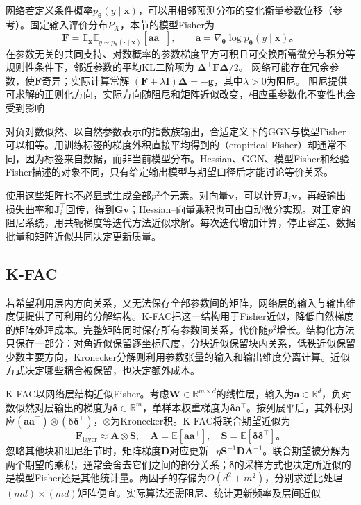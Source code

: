 网络若定义条件概率$p_{\bm\theta}(y\mid\bm x)$，可以用相邻预测分布的变化衡量参数位移（参考）。固定输入评价分布$P_X$，本节的模型Fisher为
\begin{equation}
  \bm F=\mathbb E_{\bm x}\mathbb E_{y\sim p_{\bm\theta}(\cdot\mid\bm x)}
    [\bm a\bm a^{\top}],\qquad
  \bm a=\nabla_{\bm\theta}\log p_{\bm\theta}(y\mid\bm x)\text{。}
  \label{eq:training-fisher}
\end{equation}
在参数无关的共同支持、对数概率的参数梯度平方可积且可交换所需微分与积分等规则性条件下，邻近参数的平均KL二阶项为
$\bm\Delta^\top\bm F\bm\Delta/2$。
网络可能存在冗余参数，使$\bm F$奇异；实际计算常解
$(\bm F+\lambda\bm I)\bm\Delta=-\bm g$，其中$\lambda>0$为阻尼。
阻尼提供可求解的正则化方向，实际方向随阻尼和矩阵近似改变，相应重参数化不变性也会受到影响

对负对数似然、以自然参数表示的指数族输出，合适定义下的GGN与模型Fisher可以相等。用训练标签的梯度外积直接平均得到的（empirical Fisher）却通常不同，因为标签来自数据，而非当前模型分布。Hessian、GGN、模型Fisher和经验Fisher描述的对象不同，只有给定输出模型与期望口径后才能讨论等价关系。

使用这些矩阵也不必显式生成全部$p^2$个元素。对向量$\bm v$，可以计算$\bm J_i\bm v$，再经输出损失曲率和$\bm J_i^{\top}$回传，得到$\bm G\bm v$；Hessian--向量乘积也可由自动微分实现。对正定的阻尼系统，用共轭梯度等迭代方法近似求解。每次迭代增加计算，停止容差、数据批量和矩阵近似共同决定更新质量。

\subsection{K-FAC}
\label{sec:training-structured-preconditioning}

若希望利用层内方向关系，又无法保存全部参数间的矩阵，网络层的输入与输出维度便提供了可利用的分解结构。K-FAC把这一结构用于Fisher近似，降低自然梯度的矩阵处理成本。完整矩阵同时保存所有参数间关系，代价随$p^2$增长。结构化方法只保存一部分：对角近似保留逐坐标尺度，分块近似保留块内关系，低秩近似保留少数主要方向，Kronecker分解则利用参数张量的输入和输出维度分离计算。近似方式决定哪些耦合被保留，也决定额外成本。

K-FAC以网络层结构近似Fisher。考虑$\bm W\in\mathbb R^{m\times d}$的线性层，输入为$\bm a\in\mathbb R^d$，负对数似然对层输出的梯度为$\bm\delta\in\mathbb R^m$，单样本权重梯度为$\bm\delta\bm a^{\top}$。按列展平后，其外积对应$(\bm a\bm a^{\top})\otimes(\bm\delta\bm\delta^{\top})$，$\otimes$为Kronecker积。K-FAC将联合期望近似为
\begin{equation}
  \bm F_{\mathrm{layer}}\approx\bm A\otimes\bm S,
  \quad\bm A=\mathbb E[\bm a\bm a^{\top}],\quad
  \bm S=\mathbb E[\bm\delta\bm\delta^{\top}]\text{。}
  \label{eq:training-kfac}
\end{equation}
忽略其他块和阻尼细节时，矩阵梯度$\bm D$对应更新$-\eta\bm S^{-1}\bm D\bm A^{-1}$。联合期望被分解为两个期望的乘积，通常会舍去它们之间的部分关系；$\bm\delta$的采样方式也决定所近似的是模型Fisher还是其他统计量。两因子的存储为$O(d^2+m^2)$，分别求逆比处理$(md)\times(md)$矩阵便宜。实际算法还需阻尼、统计更新频率及层间近似

